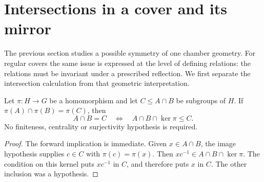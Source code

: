 \section{Intersections in a cover and its mirror}
\label{sec:mirrors}
The previous section studies a possible symmetry of one chamber geometry. For regular covers the same issue is expressed at the level of defining relations: the relations must be invariant under a prescribed reflection. We first separate the intersection calculation from that geometric interpretation.

\begin{theorem}\label{thm:transport}
Let $\pi:H\to G$ be a homomorphism and let $C\leq A\cap B$ be subgroups of $H$. If $\pi(A)\cap\pi(B)=\pi(C)$, then
\[
 A\cap B=C\quad\Longleftrightarrow\quad
                    A\cap B\cap\ker\pi\leq C.
\]
No finiteness, centrality or surjectivity hypothesis is required.
\end{theorem}
\begin{proof}
The forward implication is immediate. Given $x\in A\cap B$, the image hypothesis supplies $c\in C$ with $\pi(c)=\pi(x)$. Then $xc^{-1}\in A\cap B\cap\ker\pi$. The condition on this kernel puts $xc^{-1}$ in $C$, and therefore puts $x$ in $C$. The other inclusion was a hypothesis.
\end{proof}

